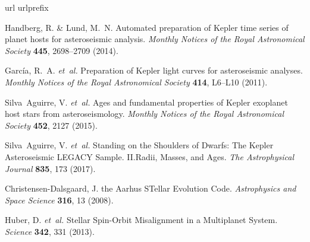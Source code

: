\begin{thebibliography}{10}
\expandafter\ifx\csname url\endcsname\relax
  \def\url#1{\texttt{#1}}\fi
\expandafter\ifx\csname urlprefix\endcsname\relax\def\urlprefix{URL }\fi
\providecommand{\bibinfo}[2]{#2}
\providecommand{\eprint}[2][]{\url{#2}}

\bibinfo{author}{Handberg, R.} \& \bibinfo{author}{Lund, M.~N.}
\newblock \bibinfo{title}{Automated preparation of {{Kepler}} time series of
  planet hosts for asteroseismic analysis}.
\newblock \emph{\bibinfo{journal}{Monthly Notices of the Royal Astronomical
  Society}} \textbf{\bibinfo{volume}{445}}, \bibinfo{pages}{2698--2709}
  (\bibinfo{year}{2014}).

\bibinfo{author}{Garc{\'i}a, R.~A.} \emph{et~al.}
\newblock \bibinfo{title}{Preparation of {{Kepler}} light curves for
  asteroseismic analyses}.
\newblock \emph{\bibinfo{journal}{Monthly Notices of the Royal Astronomical
  Society}} \textbf{\bibinfo{volume}{414}}, \bibinfo{pages}{L6--L10}
  (\bibinfo{year}{2011}).

\bibinfo{author}{Silva~Aguirre, V.} \emph{et~al.}
\newblock \bibinfo{title}{Ages and fundamental properties of {{Kepler}}
  exoplanet host stars from asteroseismology}.
\newblock \emph{\bibinfo{journal}{Monthly Notices of the Royal Astronomical
  Society}} \textbf{\bibinfo{volume}{452}}, \bibinfo{pages}{2127}
  (\bibinfo{year}{2015}).

\bibinfo{author}{Silva~Aguirre, V.} \emph{et~al.}
\newblock \bibinfo{title}{Standing on the {{Shoulders}} of {{Dwarfs}}: The
  {{Kepler Asteroseismic LEGACY Sample}}. {{II}}.{{Radii}}, {{Masses}}, and
  {{Ages}}}.
\newblock \emph{\bibinfo{journal}{The Astrophysical Journal}}
  \textbf{\bibinfo{volume}{835}}, \bibinfo{pages}{173} (\bibinfo{year}{2017}).

\bibinfo{author}{{Christensen-Dalsgaard}, J.}
\newblock \bibinfo{title}{{{ASTEC}}\textemdash the {{Aarhus STellar Evolution
  Code}}}.
\newblock \emph{\bibinfo{journal}{Astrophysics and Space Science}}
  \textbf{\bibinfo{volume}{316}}, \bibinfo{pages}{13} (\bibinfo{year}{2008}).

\bibinfo{author}{Huber, D.} \emph{et~al.}
\newblock \bibinfo{title}{Stellar {{Spin}}-{{Orbit Misalignment}} in a
  {{Multiplanet System}}}.
\newblock \emph{\bibinfo{journal}{Science}} \textbf{\bibinfo{volume}{342}},
  \bibinfo{pages}{331} (\bibinfo{year}{2013}).


\end{thebibliography}
